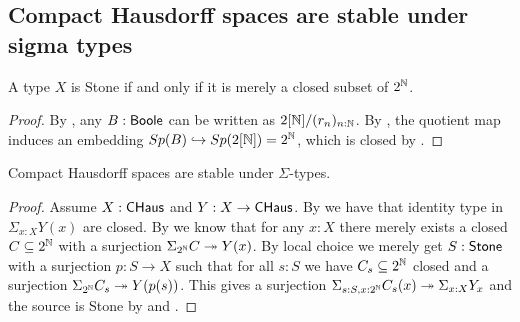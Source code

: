 \subsection{Compact Hausdorff spaces are stable under sigma types}

\begin{lemma}\label{StoneAsClosedSubsetOfCantor}
A type $X$ is Stone if and only if it is merely a closed subset of $2^{\mathbb{N}}$.
\end{lemma}
\begin{proof}
  By , any $B:\mathsf{Boole}$ can be written as $2[\mathbb{N}]/(r_n)_{n:\mathbb{N}}$. %
  By , the quotient map induces an embedding $Sp(B)\hookrightarrow Sp(2[\mathbb{N}])= 2^{\mathbb{N}}$, 
  which is closed by .
\end{proof}


\begin{lemma}\label{SigmaCompactHausdorff}
Compact Hausdorff spaces are stable under $\Sigma$-types.
\end{lemma}

\begin{proof}
Assume $X:\mathsf{CHaus}$ and $Y:X\to \mathsf{CHaus}$. By  we have that identity type in $\Sigma_{x:X}Y(x)$ are closed. By  we know that for any $x:X$ there merely exists a closed $C\subseteq 2^{\mathbb{N}}$ with a surjection $\Sigma_{2^{\mathbb{N}}}C \twoheadrightarrow Y(x)$. By local choice we merely get $S:\mathsf{Stone}$ with a surjection $p:S\to X$ such that for all $s:S$ we have $C_s\subseteq 2^{\mathbb{N}}$ closed and a surjection $\Sigma_{2^{\mathbb{N}}}C_s\twoheadrightarrow Y(p(s))$. This gives a surjection $\Sigma_{s:S,x:2^{\mathbb{N}}}C_s(x)\twoheadrightarrow\Sigma_{x:X}Y_x$ and the source is Stone by  and .
\end{proof}

